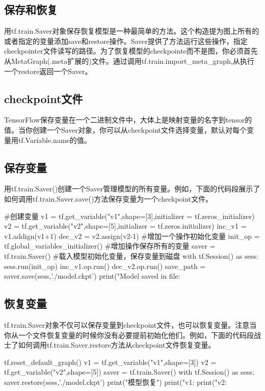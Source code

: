 \subsection{保存和恢复}
用tf.train.Saver对象保存恢复模型是一种最简单的方法。这个构造提为图上所有的或者指定的变量添加save和restore操作。Saver提供了方法运行这些操作，指定checkpointer文件读写的路径。为了恢复模型的checkpointe而不是图，你必须首先从MetaGraph(.meta扩展的)文件。通过调用tf.train.import\_meta\_graph,从执行一个restore返回一个Saver。
\subsection{checkpoint文件}
TensorFlow保存变量在一个二进制文件中，大体上是映射变量的名字到tensor的值。当你创建一个Saver对象，你可以从checkpoint文件选择变量，默认对每个变量用tf.Variable.name的值。
\subsection{保存变量}
用tf.train.Saver()创建一个Saver管理模型的所有变量。例如，下面的代码段展示了如何调用tf.train.Saver.save()方法保存变量为一个checkpoint文件。
\begin{python}
#创建变量
v1 = tf.get_variable("v1",shape=[3],initializer = tf.zeros_initializer)
v2 = tf.get_variable("v2",shape=[5],initializer = tf.zeros.initializer)
inc_v1 = v1.addign(v1+1)
dec_v2 = v2.assign(v2-1)
#增加一个操作初始化变量
init_op = tf.global_variables_initializer()
#增加操作保存所有的变量
saver = tf.train.Saver()
#载入模型初始化变量，保存变量到磁盘
with tf.Session() as sess:
    sess.run(init_op)
    inc_v1.op.run()
    dec_v2.op.run()
    save_path = saver.save(sess,'./model.ckpt')
    print("Model saved in file:%
\end{python}
\subsection{恢复变量}
tf.train.Saver对象不仅可以保存变量到checkpoint文件，也可以恢复变量。注意当你从一个文件恢复变量的时候你没有必要提前初始化他们。例如，下面的代码段战士了如何调用tf.train.Saver.restore方法从checkpoint文件恢复变量。
\begin{python}
tf.reset_default_graph()
v1 = tf.get_variable("v1",shape=[3])
v2 = tf.get_variable("v2",shape=[5])
saver = tf.train.Saver()
with tf.Session() as sess:
    saver.restore(sess,'./model.ckpt')
    print("模型恢复")
    print("v1:%
    print("v2:%
\end{python}
